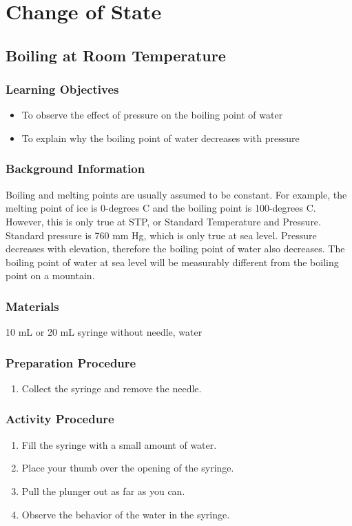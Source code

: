 \section{Change of State}

\subsection{Boiling at Room Temperature}

\subsubsection*{Learning Objectives}
\begin{itemize}
\item{To observe the effect of pressure on the boiling point of water} 
\item{To explain why the boiling point of water decreases with pressure} 
\end{itemize}

\subsubsection*{Background Information}
Boiling and melting points are usually assumed to be constant. For example, the melting point of ice is 0-degrees C and the boiling point is 100-degrees C. However, this is only true at STP, or Standard Temperature and Pressure. Standard pressure is 760 mm Hg, which is only true at sea level. Pressure decreases with elevation, therefore the boiling point of water also decreases. The boiling point of water at sea level will be measurably different from the boiling point on a mountain.  

\subsubsection*{Materials}
10 mL or 20 mL syringe without needle, water

\subsubsection*{Preparation Procedure}
\begin{enumerate}
\item{Collect the syringe and remove the needle.} 
\end{enumerate}

\subsubsection*{Activity Procedure}
\begin{enumerate}
\item{Fill the syringe with a small amount of water.} 
\item{Place your thumb over the opening of the syringe.} 
\item{Pull the plunger out as far as you can.} 
\item{Observe the behavior of the water in the syringe.} 
\end{enumerate}


